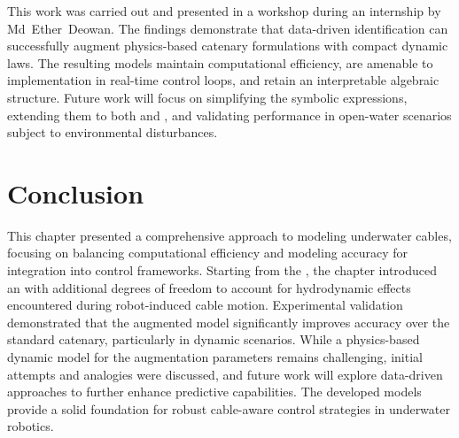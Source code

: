 This work was carried out and presented in a workshop
\parencite{deowanSymbolicRegressionDynamic2025} during an internship by Md~Ether~Deowan. The
findings demonstrate that data-driven identification can successfully augment physics-based
catenary formulations with compact dynamic laws. The resulting models maintain computational
efficiency, are amenable to implementation in real-time control loops, and retain an interpretable
algebraic structure. Future work will focus on simplifying the symbolic expressions, extending them
to both \scal{\theta} and \scal{\gamma}, and validating performance in open-water scenarios subject
to environmental disturbances.

\section{Conclusion}
\label{cm_conclusion}

This chapter presented a comprehensive approach to modeling underwater cables, focusing on
balancing computational efficiency and modeling accuracy for integration into control frameworks.
Starting from the \verticalmodel{}, the chapter introduced an \augmentedmodel{} with additional
degrees of freedom to account for hydrodynamic effects encountered during robot-induced cable
motion. Experimental validation demonstrated that the augmented model significantly improves
accuracy over the standard catenary, particularly in dynamic scenarios. While a physics-based
dynamic model for the augmentation parameters remains challenging, initial attempts and analogies
were discussed, and future work will explore data-driven approaches to further enhance predictive
capabilities. The developed models provide a solid foundation for robust cable-aware control
strategies in underwater robotics.
